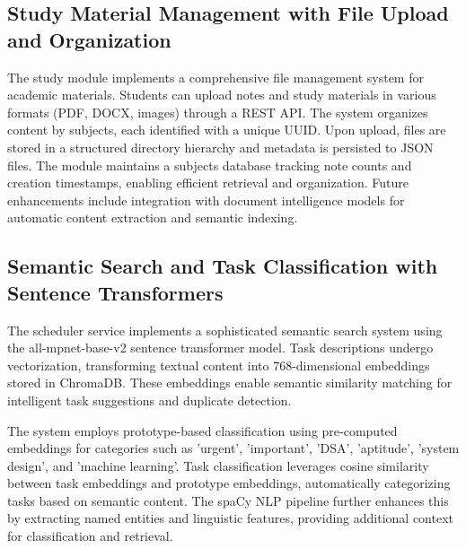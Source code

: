 \documentclass[conference]{IEEEtran}
\begin{document}
\subsection{Study Material Management with File Upload and Organization}
The study module implements a comprehensive file management system for academic materials. Students can upload notes and study materials in various formats (PDF, DOCX, images) through a REST API. The system organizes content by subjects, each identified with a unique UUID. Upon upload, files are stored in a structured directory hierarchy and metadata is persisted to JSON files. The module maintains a subjects database tracking note counts and creation timestamps, enabling efficient retrieval and organization. Future enhancements include integration with document intelligence models for automatic content extraction and semantic indexing.

\subsection{Semantic Search and Task Classification with Sentence Transformers}
The scheduler service implements a sophisticated semantic search system using the all-mpnet-base-v2 sentence transformer model. Task descriptions undergo vectorization, transforming textual content into 768-dimensional embeddings stored in ChromaDB. These embeddings enable semantic similarity matching for intelligent task suggestions and duplicate detection. 

The system employs prototype-based classification using pre-computed embeddings for categories such as 'urgent', 'important', 'DSA', 'aptitude', 'system design', and 'machine learning'. Task classification leverages cosine similarity between task embeddings and prototype embeddings, automatically categorizing tasks based on semantic content. The spaCy NLP pipeline further enhances this by extracting named entities and linguistic features, providing additional context for classification and retrieval.
\end{document}

